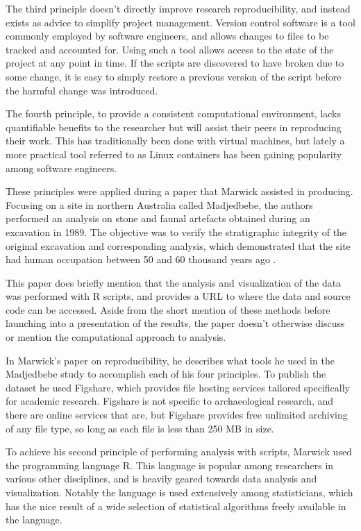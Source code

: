 \documentclass[12pt]{article}
\begin{document}
The third principle doesn't directly improve research reproducibility, and
instead exists as advice to simplify project management. Version control
software is a tool commonly employed by software engineers, and allows changes
to files to be tracked and accounted for. Using such a tool allows access to
the state of the project at any point in time. If the scripts are discovered to
have broken due to some change, it is easy to simply restore a previous version
of the script before the harmful change was introduced.

The fourth principle, to provide a consistent computational environment, lacks
quantifiable benefits to the researcher but will assist their peers in
reproducing their work. This has traditionally been done with virtual machines,
but lately a more practical tool referred to as Linux containers has been
gaining popularity among software engineers.

These principles were applied during a paper that Marwick assisted in
producing. Focusing on a site in northern Australia called Madjedbebe, the
authors performed an analysis on stone and faunal artefacts obtained during an
excavation in 1989. The objective was to verify the stratigraphic integrity of
the original excavation and corresponding analysis, which demonstrated that the
site had human occupation between 50 and 60 thousand years ago
\cite{clarkson15}.

This paper does briefly mention that the analysis and visualization of the data
was performed with R scripts, and provides a URL to where the data and source
code can be accessed. Aside from the short mention of these methods before
launching into a presentation of the results, the paper doesn't otherwise
discuss or mention the computational approach to analysis.

In Marwick's paper on reproducibility, he describes what tools he used in the
Madjedbebe study to accomplish each of his four principles. To publish the
dataset he used Figshare, which provides file hosting services tailored
specifically for academic research. Figshare is not specific to archaeological
research, and there are online services that are, but Figshare provides free
unlimited archiving of any file type, so long as each file is less than 250 MB
in size.

To achieve his second principle of performing analysis with scripts, Marwick
used the programming language R. This language is popular among researchers in
various other disciplines, and is heavily geared towards data analysis and
visualization. Notably the language is used extensively among statisticians,
which has the nice result of a wide selection of statistical algorithms freely
available in the language.
\end{document}
